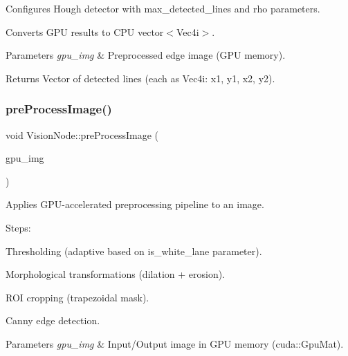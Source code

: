 \begin{DoxyItemize}
\item Configures Hough detector with {\ttfamily max\+\_\+detected\+\_\+lines} and {\ttfamily rho} parameters.
\item Converts G\+PU results to C\+PU vector$<$\+Vec4i$>$.
\end{DoxyItemize}


\begin{DoxyParams}{Parameters}
{\em gpu\+\_\+img} & Preprocessed edge image (G\+PU memory). \\
\hline
\end{DoxyParams}
\begin{DoxyReturn}{Returns}
Vector of detected lines (each as Vec4i\+: x1, y1, x2, y2). 
\end{DoxyReturn}
\mbox{\label{classVisionNode_ae2b6a2048ef69189b097ddc79b085603}} 
\subsubsection{\texorpdfstring{pre\+Process\+Image()}{preProcessImage()}}
{\footnotesize\ttfamily void Vision\+Node\+::pre\+Process\+Image (\begin{DoxyParamCaption}\item[{cv\+::cuda\+::\+Gpu\+Mat \&}]{gpu\+\_\+img }\end{DoxyParamCaption})\hspace{0.3cm}{\ttfamily [private]}}



Applies G\+P\+U-\/accelerated preprocessing pipeline to an image. 

Steps\+:
\begin{DoxyEnumerate}
\item Thresholding (adaptive based on {\ttfamily is\+\_\+white\+\_\+lane} parameter).
\item Morphological transformations (dilation + erosion).
\item R\+OI cropping (trapezoidal mask).
\item Canny edge detection.
\end{DoxyEnumerate}


\begin{DoxyParams}{Parameters}
{\em gpu\+\_\+img} & Input/\+Output image in G\+PU memory (cuda\+::\+Gpu\+Mat). \\
\hline
\end{DoxyParams}
\mbox{\label{classVisionNode_a4d826b83d642f5033c796a8f89cd2b58}} 
